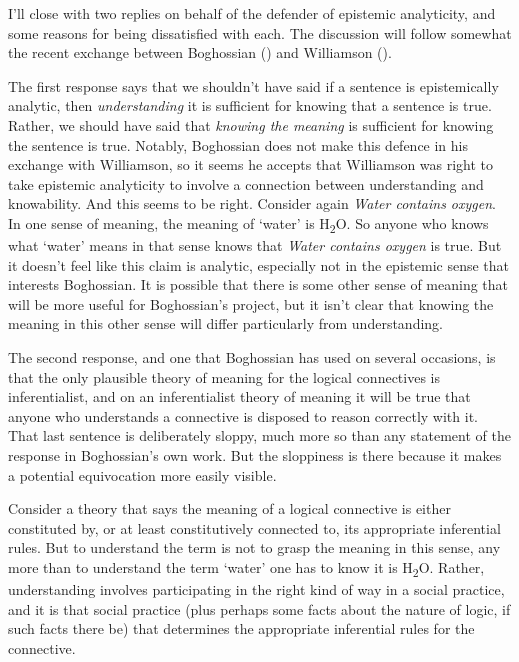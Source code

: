 \documentclass[
  10pt,
  letterpaper,
  DIV=11,
  numbers=noendperiod,
  twoside]{scrartcl}
\begin{document}
I'll close with two replies on behalf of the defender of epistemic
analyticity, and some reasons for being dissatisfied with each. The
discussion will follow somewhat the recent exchange between Boghossian
() and Williamson
().

The first response says that we shouldn't have said if a sentence is
epistemically analytic, then \emph{understanding} it is sufficient for
knowing that a sentence is true. Rather, we should have said that
\emph{knowing the meaning} is sufficient for knowing the sentence is
true. Notably, Boghossian does not make this defence in his exchange
with Williamson, so it seems he accepts that Williamson was right to
take epistemic analyticity to involve a connection between understanding
and knowability. And this seems to be right. Consider again \emph{Water
contains oxygen}. In one sense of meaning, the meaning of `water' is
H\textsubscript{2}O. So anyone who knows what `water' means in that
sense knows that \emph{Water contains oxygen} is true. But it doesn't
feel like this claim is analytic, especially not in the epistemic sense
that interests Boghossian. It is possible that there is some other sense
of meaning that will be more useful for Boghossian's project, but it
isn't clear that knowing the meaning in this other sense will differ
particularly from understanding.

The second response, and one that Boghossian has used on several
occasions, is that the only plausible theory of meaning for the logical
connectives is inferentialist, and on an inferentialist theory of
meaning it will be true that anyone who understands a connective is
disposed to reason correctly with it. That last sentence is deliberately
sloppy, much more so than any statement of the response in Boghossian's
own work. But the sloppiness is there because it makes a potential
equivocation more easily visible.

Consider a theory that says the meaning of a logical connective is
either constituted by, or at least constitutively connected to, its
appropriate inferential rules. But to understand the term is not to
grasp the meaning in this sense, any more than to understand the term
`water' one has to know it is H\textsubscript{2}O. Rather, understanding
involves participating in the right kind of way in a social practice,
and it is that social practice (plus perhaps some facts about the nature
of logic, if such facts there be) that determines the appropriate
inferential rules for the connective.
\end{document}
